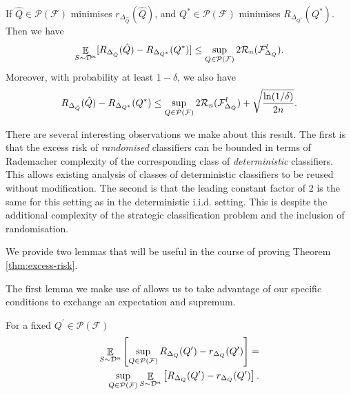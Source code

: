 \begin{theorem}
    If $\hat{Q} \in \mathcal{P}(\mathcal{F})$ minimises $r_{\Delta_{\hat{Q}}}(\hat{Q})$, and $Q^{\ast} \in \mathcal{P}(\mathcal{F})$ minimises $R_{\Delta_{Q^{\ast}}}(Q^{\ast})$. Then we have
    \begin{equation*}
        \mathop{\mathbb{E}}_{S \sim \mathcal{D}^{n}} [R_{\Delta_{\hat{Q}}}(\hat{Q}) - R_{\Delta_{Q^\ast}}(Q^\ast)] \leq \sup_{Q \in {\mathcal{P}}({\mathcal{F}})} 2 {\mathcal{R}}_{n}({\mathcal{F}}^{l}_{\Delta_Q}).
    \end{equation*}
    Moreover, with probability at least $1-\delta$, we also have
    \begin{equation}
        R_{\Delta_{\hat{Q}}}(\hat{Q}) - R_{\Delta_{Q^\ast}}(Q^\ast) \leq \sup_{Q \in {\mathcal{P}}({\mathcal{F}})} 2 {\mathcal{R}}_{n}({\mathcal{F}}^{l}_{\Delta_Q}) + \sqrt{\frac{\ln(1/\delta)}{2n}}.
    \end{equation}
    \label{thm:excess-risk}
\end{theorem}

There are several interesting observations we make about this result. The first is that the excess risk of \emph{randomised} classifiers can be bounded in terms of Rademacher complexity of the corresponding class of \emph{deterministic} classifiers. This allows existing analysis of classes of deterministic classifiers to be reused without modification. The second is that the leading constant factor of $2$ is the same for this setting as in the deterministic i.i.d. setting. This is despite the additional complexity of the strategic classification problem and the inclusion of randomisation.

We provide two lemmas that will be useful in the course of proving Theorem \ref{thm:excess-risk}.


The first lemma we make use of allows us to take advantage of our specific conditions to exchange an expectation and supremum.

\begin{lemma}
   For a fixed $Q^\prime \in \mathcal{P}(\mathcal{F})$
   \begin{equation}
       \begin{split}
           \mathop{\mathbb{E}}_{S \sim \mathcal{D}^{n}} \left[ \sup_{Q \in {\mathcal{P}}({\mathcal{F}})} R_{\Delta_{Q}}(Q^\prime) - r_{\Delta_{Q}}(Q^\prime) \right] =\\
           \sup_{Q \in {\mathcal{P}}({\mathcal{F}})} \mathop{\mathbb{E}}_{S \sim \mathcal{D}^{n}} \left[ R_{\Delta_{Q}}(Q^\prime) - r_{\Delta_{Q}}(Q^\prime) \right].
       \end{split}
   \end{equation}
   \label{lemma:sup_exp_swap}
\end{lemma}

